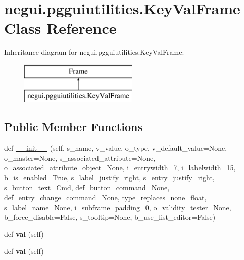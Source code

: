 \hypertarget{classnegui_1_1pgguiutilities_1_1KeyValFrame}{}\section{negui.\+pgguiutilities.\+Key\+Val\+Frame Class Reference}
\label{classnegui_1_1pgguiutilities_1_1KeyValFrame}
Inheritance diagram for negui.\+pgguiutilities.\+Key\+Val\+Frame\+:\begin{figure}[H]
\begin{center}
\leavevmode
\includegraphics[height=2.000000cm]{classnegui_1_1pgguiutilities_1_1KeyValFrame}
\end{center}
\end{figure}
\subsection*{Public Member Functions}
\begin{DoxyCompactItemize}
\item 
def \hyperlink{classnegui_1_1pgguiutilities_1_1KeyValFrame_a9d507011f4523f708351c682b788f3e5}{\+\_\+\+\_\+init\+\_\+\+\_\+} (self, s\+\_\+name, v\+\_\+value, o\+\_\+type, v\+\_\+default\+\_\+value=None, o\+\_\+master=None, s\+\_\+associated\+\_\+attribute=None, o\+\_\+associated\+\_\+attribute\+\_\+object=None, i\+\_\+entrywidth=7, i\+\_\+labelwidth=15, b\+\_\+is\+\_\+enabled=True, s\+\_\+label\+\_\+justify=\textquotesingle{}right\textquotesingle{}, s\+\_\+entry\+\_\+justify=\textquotesingle{}right\textquotesingle{}, s\+\_\+button\+\_\+text=\textquotesingle{}Cmd\textquotesingle{}, def\+\_\+button\+\_\+command=None, def\+\_\+entry\+\_\+change\+\_\+command=None, type\+\_\+replaces\+\_\+none=float, s\+\_\+label\+\_\+name=None, i\+\_\+subframe\+\_\+padding=0, o\+\_\+validity\+\_\+tester=None, b\+\_\+force\+\_\+disable=False, s\+\_\+tooltip=None, b\+\_\+use\+\_\+list\+\_\+editor=False)
\item 
def {\bfseries val} (self)\hypertarget{classnegui_1_1pgguiutilities_1_1KeyValFrame_a735c32759de5e4519d15ec2511da6e4f}{}\label{classnegui_1_1pgguiutilities_1_1KeyValFrame_a735c32759de5e4519d15ec2511da6e4f}

\item 
def {\bfseries val} (self)\hypertarget{classnegui_1_1pgguiutilities_1_1KeyValFrame_a735c32759de5e4519d15ec2511da6e4f}{}\label{classnegui_1_1pgguiutilities_1_1KeyValFrame_a735c32759de5e4519d15ec2511da6e4f}

\end{DoxyCompactItemize}
